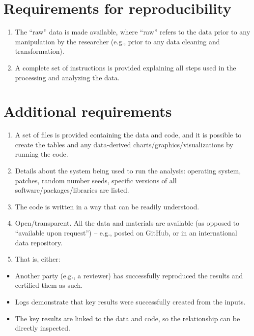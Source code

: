 \documentclass[
]{book}
\providecommand{\tightlist}{%
  \setlength{\itemsep}{0pt}\setlength{\parskip}{0pt}}
\begin{document}
\hypertarget{requirements-for-reproducibility}{%
\section{Requirements for reproducibility}\label{requirements-for-reproducibility}}

\begin{enumerate}
\def\labelenumi{\arabic{enumi})}
\tightlist
\item
  The ``raw'' data is made available, where ``raw'' refers to the data prior to any manipulation by the researcher (e.g., prior to any data cleaning and transformation).
\item
  A complete set of instructions is provided explaining all steps used in the processing and analyzing the data.
\end{enumerate}

\hypertarget{additional-requirements}{%
\section{Additional requirements}\label{additional-requirements}}

\begin{enumerate}
\def\labelenumi{\alph{enumi})}
\item
  A set of files is provided containing the data and code, and it is possible to create the tables and any data-derived charts/graphics/visualizations by running the code.
\item
  Details about the system being used to run the analysis: operating system, patches, random number seeds, specific versions of all software/packages/libraries are listed.
\item
  The code is written in a way that can be readily understood.
\item
  Open/transparent. All the data and materials are available (as opposed to ``available upon request'') -- e.g., posted on GitHub, or in an international data repository.
\item
  That is, either:
\end{enumerate}

\begin{itemize}
\tightlist
\item
  Another party (e.g., a reviewer) has successfully reproduced the results and certified them as such.\\
\item
  Logs demonstrate that key results were successfully created from the inputs.\\
\item
  The key results are linked to the data and code, so the relationship can be directly inspected.
\end{itemize}
\end{document}
